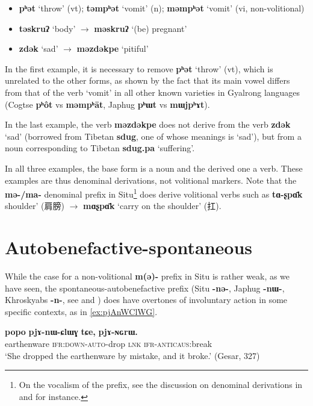 \documentclass[oneside,a4paper,11pt]{article}
\newcommand{\ipa}[1]{\textbf{{\phon\mbox{#1}}}} %
\newcommand{\zh}[1]{{\cn #1}}
\begin{document}
\begin{itemize}
\item \ipa{pʰət} `throw' (vt); \ipa{təmpʰət} `vomit' (n); \ipa{məmpʰət} `vomit' (vi, non-volitional)
\item \ipa{təskruʔ} `body' $\rightarrow$ \ipa{məskruʔ} `(be) pregnant'
\item \ipa{zdək} `sad' $\rightarrow$ \ipa{məzdəkpe} `pitiful'
\end{itemize}

In the first example, it is necessary to remove \ipa{pʰət} `throw' (vt), which is unrelated to the other forms, as shown by the fact that its main vowel differs from that of the verb `vomit' in all other known varieties in Gyalrong languages (Cogtse \ipa{pʰôt} vs \ipa{məmpʰāt}, Japhug \ipa{pʰɯt} vs \ipa{mɯjpʰɤt}).

In the last example, the verb \ipa{məzdəkpe} does not derive from the verb \ipa{zdək} `sad' (borrowed from Tibetan \ipa{sdug}, one of whose meanings is `sad'), but from a noun corresponding to Tibetan \ipa{sdug.pa} `suffering'.

In all three examples, the base form is a noun and the derived one a verb. These examples are thus denominal derivations, not volitional markers. Note that the \ipa{mə-/ma-} denominal prefix in Situ\footnote{On the vocalism of the prefix, see the discussion on denominal derivations in \citet{jackson98morphology} and \citet{linxr93jiarong} for instance.} does derive volitional verbs such as \ipa{tɑ-ʂpɑ̄k}  shoulder'  (\zh{肩膀}) $\rightarrow$ \ipa{mɑʂpɑ̄k} `carry on the shoulder' (\zh{扛}).


\section{Autobenefactive-spontaneous}
While the case for a non-volitional \ipa{m(ə)-} prefix in Situ is rather weak, as we have seen, the spontaneous-autobenefactive prefix (Situ \ipa{-nə-}, Japhug \ipa{-nɯ-}, Khroskyabs \ipa{-n-}, see  \citealt{jacques15spontaneous} and  \citealt[158-160]{lai13affixale}) does have overtones of involuntary action in some specific contexts, as in \ref{ex:pjAnWClWG}. 

\begin{exe}
\ex \label{ex:pjAnWClWG}
\gll \ipa{popo} 	\ipa{pjɤ-nɯ-ɕlɯɣ} 	\ipa{tɕe,} 	\ipa{pjɤ-ɴɢrɯ.}  \\
earthenware \textsc{ifr:down-auto}-drop \textsc{lnk} \textsc{ifr-anticaus}:break \\
\glt `She dropped the earthenware by mistake, and it broke.' (Gesar, 327)
\end{exe}
\end{document}
